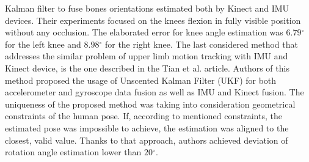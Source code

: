 \documentclass[sensors,article,submit,moreauthors,pdftex,10pt,a4paper]{mdpi}
\newcommand{\degree}{\ensuremath{{}^{\circ}}\xspace}
\begin{document}
Kalman filter to fuse bones orientations estimated both by Kinect and IMU devices. Their experiments focused on the knees flexion in fully visible position without any occlusion. The elaborated error for knee angle estimation was $6.79\degree$ for the left knee and $8.98\degree$ for the right knee. The last considered method that addresses the similar problem of upper limb motion tracking with IMU and Kinect device, is the one described in the Tian et al. \cite{Tian2015a} article. Authors of this method proposed the usage of Unscented Kalman Filter (UKF) for both accelerometer and gyroscope data fusion as well as IMU and Kinect fusion. The uniqueness of the proposed method was taking into consideration geometrical constraints of the human pose. If, according to mentioned constraints, the estimated pose was impossible to achieve, the estimation was aligned to the closest, valid value. Thanks to that approach, authors achieved deviation of rotation angle estimation lower than $20\degree$.
\end{document}
